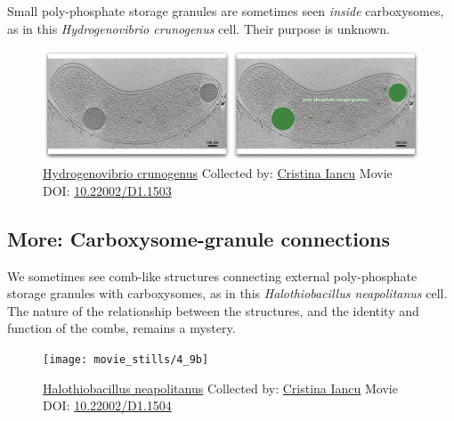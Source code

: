 \documentclass[]{tufte-book}
\begin{document}
Small poly-phosphate storage granules are sometimes seen \emph{inside}
carboxysomes, as in this \emph{Hydrogenovibrio crunogenus} cell. Their
purpose is unknown.





\begin{figure}
\includegraphics{movie_stills/4_9a} \caption[\protect\hyperlink{tree}{Hydrogenovibrio crunogenus}
Collected by: \protect\hyperlink{cristina_iancu}{Cristina Iancu} Movie
DOI: \href{https://doi.org/10.22002/D1.1503}{10.22002/D1.1503}]{\protect\hyperlink{tree}{Hydrogenovibrio crunogenus}
Collected by: \protect\hyperlink{cristina_iancu}{Cristina Iancu} Movie
DOI: \href{https://doi.org/10.22002/D1.1503}{10.22002/D1.1503}}\label{fig:4-9a}
\end{figure}

\hypertarget{Carboxysome-granule_connections}{\subsection*{More:
Carboxysome-granule connections}\label{Carboxysome-granule_connections}}

We sometimes see comb-like structures connecting external poly-phosphate
storage granules with carboxysomes, as in this \emph{Halothiobacillus
neapolitanus} cell. The nature of the relationship between the
structures, and the identity and function of the combs, remains a
mystery.





\begin{figure}
\texttt{[image: movie\_stills/4\_9b]} \caption[\protect\hyperlink{tree}{Halothiobacillus neapolitanus}
Collected by: \protect\hyperlink{cristina_iancu}{Cristina Iancu} Movie
DOI: \href{https://doi.org/10.22002/D1.1504}{10.22002/D1.1504}]{\protect\hyperlink{tree}{Halothiobacillus neapolitanus}
Collected by: \protect\hyperlink{cristina_iancu}{Cristina Iancu} Movie
DOI: \href{https://doi.org/10.22002/D1.1504}{10.22002/D1.1504}}\label{fig:4-9b}
\end{figure}
\end{document}
